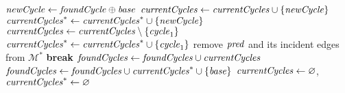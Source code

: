 \begin{algorithmic}[1]
            \State $\mathit{newCycle} \leftarrow \mathit{foundCycle} \oplus \mathit{base}$
                \State $\mathit{currentCycles} \leftarrow \mathit{currentCycles} \cup \{\mathit{newCycle}\}$
            \Else
                \State $\mathit{currentCycles}^{*} \leftarrow \mathit{currentCycles}^{*} \cup \{\mathit{newCycle}\}$
            \EndIf
        \EndFor
                \State $\mathit{currentCycles} \leftarrow \mathit{currentCycles} \setminus \{\mathit{cycle}_1\}$
                \State $\mathit{currentCycles}^{*} \leftarrow \mathit{currentCycles}^{*} \cup \{\mathit{cycle}_1\}$
            \EndIf
        \EndFor
        \label{lst:line:newCycles}
                \State remove $\mathit{pred}$ and its incident edges from $\mathcal{M}^{*}$
                \State \textbf{break}
            \EndIf
        \EndFor
        \State $\mathit{foundCycles} \leftarrow \mathit{foundCycles} \cup \mathit{currentCycles}$
        \State $\mathit{foundCycles} \leftarrow \mathit{foundCycles} \cup \mathit{currentCycles}^{*} \cup \{\mathit{base}\}$
        \State $\mathit{currentCycles} \leftarrow \varnothing$, $\mathit{currentCycles}^{*} \leftarrow \varnothing$
    \EndFor
\EndProcedure
\end{algorithmic}